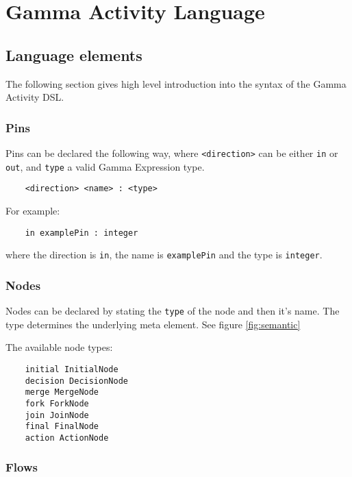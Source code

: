 \clearpage\section{Gamma Activity Language}\label{sec:gamma-activity-language-constructs}

\subsection{Language elements}

The following section gives high level introduction into the syntax of the Gamma Activity DSL.

\subsubsection*{Pins}\label{sssec:pins}

Pins can be declared the following way, where \verb|<direction>| can be either \verb|in| or \verb|out|, and \verb|type| a valid Gamma Expression type.

\begin{verbatim}
	<direction> <name> : <type>
\end{verbatim}

For example: 

\begin{verbatim}
	in examplePin : integer
\end{verbatim}

where the direction is \verb|in|, the name is \verb|examplePin| and the type is \verb|integer|.

\subsubsection*{Nodes}\label{sssec:nodes}

Nodes can be declared by stating the \verb|type| of the node and then it's name. The type determines the underlying meta element. See figure \ref{fig:semantic}

The available node types:

\begin{verbatim}
	initial InitialNode
	decision DecisionNode
	merge MergeNode
	fork ForkNode
	join JoinNode
	final FinalNode
	action ActionNode
\end{verbatim}

\subsubsection*{Flows}\label{sssec:flows}

